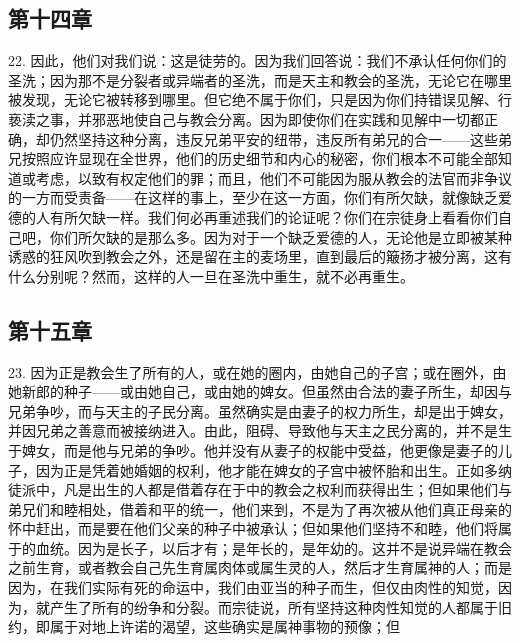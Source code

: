 
\subsection{第十四章}

22. 因此，他们对我们说：这是徒劳的。因为我们回答说：我们不承认任何你们的圣洗；因为那不是分裂者或异端者的圣洗，而是天主和教会的圣洗，无论它在哪里被发现，无论它被转移到哪里。但它绝不属于你们，只是因为你们持错误见解、行亵渎之事，并邪恶地使自己与教会分离。因为即使你们在实践和见解中一切都正确，却仍然坚持这种分离，违反兄弟平安的纽带，违反所有弟兄的合一——这些弟兄按照应许显现在全世界，他们的历史细节和内心的秘密，你们根本不可能全部知道或考虑，以致有权定他们的罪；而且，他们不可能因为服从教会的法官而非争议的一方而受责备——在这样的事上，至少在这一方面，你们有所欠缺，就像缺乏爱德的人有所欠缺一样。我们何必再重述我们的论证呢？你们在宗徒身上看看你们自己吧，你们所欠缺的是那么多。因为对于一个缺乏爱德的人，无论他是立即被某种诱惑的狂风吹到教会之外，还是留在主的麦场里，直到最后的簸扬才被分离，这有什么分别呢？然而，这样的人一旦在圣洗中重生，就不必再重生。\par


\subsection{第十五章}

23. 因为正是教会生了所有的人，或在她的圈内，由她自己的子宫；或在圈外，由她新郎的种子——或由她自己，或由她的婢女。但虽然由合法的妻子所生，却因与兄弟争吵，而与天主的子民分离。虽然确实是由妻子的权力所生，却是出于婢女，并因兄弟之善意而被接纳进入。由此，阻碍、导致他与天主之民分离的，并不是生于婢女，而是他与兄弟的争吵。他并没有从妻子的权能中受益，他更像是妻子的儿子，因为正是凭着她婚姻的权利，他才能在婢女的子宫中被怀胎和出生。正如多纳徒派中，凡是出生的人都是借着存在于中的教会之权利而获得出生；但如果他们与弟兄们和睦相处，借着和平的统一，他们来到，不是为了再次被从他们真正母亲的怀中赶出，而是要在他们父亲的种子中被承认；但如果他们坚持不和睦，他们将属于的血统。因为是长子，以后才有；是年长的，是年幼的。这并不是说异端在教会之前生育，或者教会自己先生育属肉体或属生灵的人，然后才生育属神的人；而是因为，在我们实际有死的命运中，我们由亚当的种子而生，但仅由肉性的知觉，因为，就产生了所有的纷争和分裂。而宗徒说，所有坚持这种肉性知觉的人都属于旧约，即属于对地上许诺的渴望，这些确实是属神事物的预像；但\par

